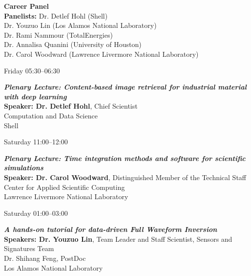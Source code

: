 \documentclass[11pt,oneside,letter]{article}
\begin{document}
\parbox{0.80\textwidth}{{\bfseries Career Panel}\\
{{\bfseries Panelists:} Dr. Detlef Hohl (Shell)} \\
\hspace*{1.85cm}Dr. Youzuo Lin (Los Alamos National Laboratory)\\
\hspace*{1.85cm}Dr. Rami Nammour (TotalEnergies)\\
\hspace*{1.85cm}Dr. Annalisa Quanini (University of Houston)\\
\hspace*{1.85cm}Dr. Carol Woodward (Lawrence Livermore National Laboratory)
}\hspace{0.20\textwidth}\vspace{3ex}


\begin{center}
{\large Friday 05:30--06:30}
\end{center}
\parbox{0.94\textwidth}{
{\bfseries\itshape Plenary Lecture: Content-based image retrieval for industrial material with deep learning}\\
{\bf Speaker: Dr. Detlef Hohl}, Chief Scientist\\
\hspace*{1.7cm}Computation and Data Science\\
\hspace*{1.7cm}Shell
}\vspace{3ex}

\begin{center}
{\large Saturday 11:00--12:00}
\end{center}
\parbox{0.94\textwidth}{
{\bfseries\itshape Plenary Lecture: Time integration methods and software for scientific simulations}\\
{\bf Speaker: Dr. Carol Woodward}, Distinguished Member of the Technical Staff\\
\hspace*{1.7cm}Center for Applied Scientific Computing\\
\hspace*{1.7cm}Lawrence Livermore National Laboratory
}\vspace{3ex}


\begin{center}
{\large Saturday 01:00--03:00}
\end{center}
\parbox{0.94\textwidth}{{\bfseries\itshape A hands-on tutorial for data-driven Full Waveform Inversion}\\
{\bf Speakers: Dr. Youzuo Lin}, Team Leader and Staff Scientist, Sensors and Signatures Team\\
\hspace*{1.83cm}Dr. Shihang Feng, PostDoc\\
\hspace*{1.83cm}Los Alamos National Laboratory
}\vspace{3ex}
\end{document}
